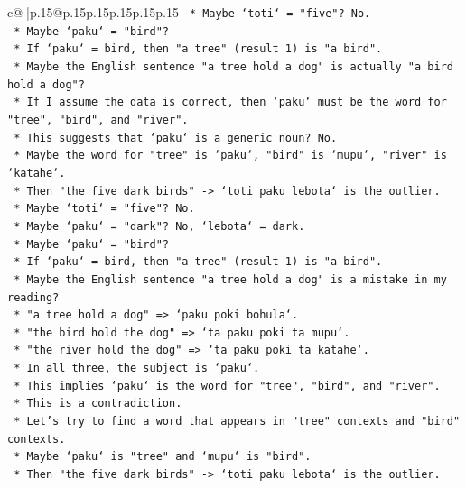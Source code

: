 \documentclass{article}
\begin{document}
{\begin{supertabular}{c@{$\;$}|p{.15\linewidth}@{}p{.15\linewidth}p{.15\linewidth}p{.15\linewidth}p{.15\linewidth}p{.15\linewidth}}
{{{\texttt{            *   Maybe `toti` = "five"? No.} \\
\texttt{            *   Maybe `paku` = "bird"?} \\
\texttt{            *   If `paku` = bird, then "a tree" (result 1) is "a bird".} \\
\texttt{            *   Maybe the English sentence "a tree hold a dog" is actually "a bird hold a dog"?} \\
\texttt{            *   If I assume the data is correct, then `paku` must be the word for "tree", "bird", and "river".} \\
\texttt{            *   This suggests that `paku` is a generic noun? No.} \\
\texttt{            *   Maybe the word for "tree" is `paku`, "bird" is `mupu`, "river" is `katahe`.} \\
\texttt{            *   Then "the five dark birds" {-}> `toti paku lebota` is the outlier.} \\
\texttt{            *   Maybe `toti` = "five"? No.} \\
\texttt{            *   Maybe `paku` = "dark"? No, `lebota` = dark.} \\
\texttt{            *   Maybe `paku` = "bird"?} \\
\texttt{            *   If `paku` = bird, then "a tree" (result 1) is "a bird".} \\
\texttt{            *   Maybe the English sentence "a tree hold a dog" is a mistake in my reading?} \\
\texttt{            *   "a tree hold a dog" => `paku poki bohula`.} \\
\texttt{            *   "the bird hold the dog" => `ta paku poki ta mupu`.} \\
\texttt{            *   "the river hold the dog" => `ta paku poki ta katahe`.} \\
\texttt{            *   In all three, the subject is `paku`.} \\
\texttt{            *   This implies `paku` is the word for "tree", "bird", and "river".} \\
\texttt{            *   This is a contradiction.} \\
\texttt{            *   Let's try to find a word that appears in "tree" contexts and "bird" contexts.} \\
\texttt{            *   Maybe `paku` is "tree" and `mupu` is "bird".} \\
\texttt{            *   Then "the five dark birds" {-}> `toti paku lebota` is the outlier.} \\
}}}
\end{supertabular}}
\end{document}
